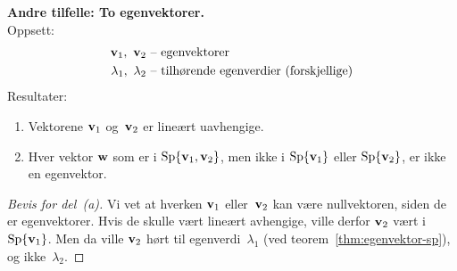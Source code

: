 \medskip
\noindent\textbf{Andre tilfelle: To egenvektorer.}
\\Oppsett:
\begin{align*}
\mathbf{v}_1,\ \mathbf{v}_2     \ &\text{-- egenvektorer} \\
\lambda_1,\ \lambda_2 \ &\text{-- tilhørende egenverdier (forskjellige)}
\end{align*}
Resultater:
\begin{enumerate}
\item[(a)] Vektorene $\mathbf{v}_1$ og~$\mathbf{v}_2$ er lineært uavhengige.
\item[(b)] Hver vektor $\mathbf{w}$ som er i $\operatorname{Sp} \{ \mathbf{v}_1, \mathbf{v}_2 \}$,
men ikke i $\operatorname{Sp} \{ \mathbf{v}_1 \}$ eller $\operatorname{Sp} \{ \mathbf{v}_2 \}$, er ikke en
egenvektor.
\end{enumerate}
\begin{proof}[Bevis for del~(a)]
Vi vet at hverken $\mathbf{v}_1$ eller~$\mathbf{v}_2$ kan være nullvektoren,
siden de er egenvektorer.  Hvis de skulle vært lineært avhengige,
ville derfor $\mathbf{v}_2$ vært i $\operatorname{Sp} \{ \mathbf{v}_1 \}$.  Men da ville
$\mathbf{v}_2$ hørt til egenverdi~$\lambda_1$ (ved
teorem~\ref{thm:egenvektor-sp}), og ikke~$\lambda_2$.
\end{proof}
